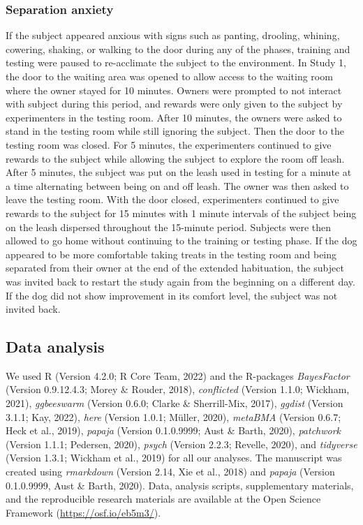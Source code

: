 \documentclass[
  pub,floatsintext]{apa6}
\begin{document}
\hypertarget{separation-anxiety}{%
\subsubsection{Separation anxiety}\label{separation-anxiety}}

If the subject appeared anxious with signs such as panting, drooling, whining, cowering, shaking, or walking to the door during any of the phases, training and testing were paused to re-acclimate the subject to the environment. In Study 1, the door to the waiting area was opened to allow access to the waiting room where the owner stayed for 10 minutes. Owners were prompted to not interact with subject during this period, and rewards were only given to the subject by experimenters in the testing room. After 10 minutes, the owners were asked to stand in the testing room while still ignoring the subject. Then the door to the testing room was closed. For 5 minutes, the experimenters continued to give rewards to the subject while allowing the subject to explore the room off leash. After 5 minutes, the subject was put on the leash used in testing for a minute at a time alternating between being on and off leash. The owner was then asked to leave the testing room. With the door closed, experimenters continued to give rewards to the subject for 15 minutes with 1 minute intervals of the subject being on the leash dispersed throughout the 15-minute period. Subjects were then allowed to go home without continuing to the training or testing phase. If the dog appeared to be more comfortable taking treats in the testing room and being separated from their owner at the end of the extended habituation, the subject was invited back to restart the study again from the beginning on a different day. If the dog did not show improvement in its comfort level, the subject was not invited back.

\hypertarget{data-analysis}{%
\subsection{Data analysis}\label{data-analysis}}

We used R (Version 4.2.0; R Core Team, 2022) and the R-packages \emph{BayesFactor} (Version 0.9.12.4.3; Morey \& Rouder, 2018), \emph{conflicted} (Version 1.1.0; Wickham, 2021), \emph{ggbeeswarm} (Version 0.6.0; Clarke \& Sherrill-Mix, 2017), \emph{ggdist} (Version 3.1.1; Kay, 2022), \emph{here} (Version 1.0.1; Müller, 2020), \emph{metaBMA} (Version 0.6.7; Heck et al., 2019), \emph{papaja} (Version 0.1.0.9999; Aust \& Barth, 2020), \emph{patchwork} (Version 1.1.1; Pedersen, 2020), \emph{psych} (Version 2.2.3; Revelle, 2020), and \emph{tidyverse} (Version 1.3.1; Wickham et al., 2019) for all our analyses. The manuscript was created using \emph{rmarkdown} (Version 2.14, Xie et al., 2018) and \emph{papaja} (Version 0.1.0.9999, Aust \& Barth, 2020). Data, analysis scripts, supplementary materials, and the reproducible research materials are available at the Open Science Framework (\url{https://osf.io/eb5m3/}).
\end{document}
